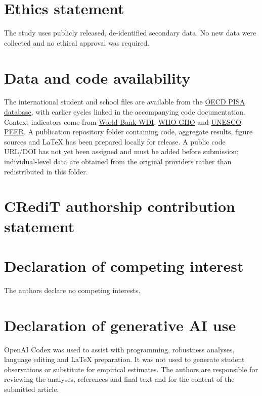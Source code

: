 \documentclass[preprint,12pt,authoryear,nonatbib]{elsarticle}
\newif\ifblindreview
\begin{document}
\section*{Ethics statement}
The study uses publicly released, de-identified secondary data. No new data were collected and no ethical approval was required.

\section*{Data and code availability}
The international student and school files are available from the \href{https://www.oecd.org/en/data/datasets/pisa-2022-database.html}{OECD PISA database}, with earlier cycles linked in the accompanying code documentation. Context indicators come from \href{https://databank.worldbank.org/source/world-development-indicators}{World Bank WDI}, \href{https://www.who.int/data/gho}{WHO GHO} and \href{https://education-profiles.org}{UNESCO PEER}. A publication repository folder containing code, aggregate results, figure sources and LaTeX has been prepared locally for release. A public code URL/DOI has not yet been assigned and must be added before submission; individual-level data are obtained from the original providers rather than redistributed in this folder.

\section*{CRediT authorship contribution statement}
\ifblindreview Author contributions are withheld for anonymous review.\else\fi

\section*{Declaration of competing interest}
The authors declare no competing interests.

\section*{Declaration of generative AI use}
OpenAI Codex was used to assist with programming, robustness analyses, language editing and LaTeX preparation. It was not used to generate student observations or substitute for empirical estimates. The authors are responsible for reviewing the analyses, references and final text and for the content of the submitted article.

\printbibliography
\end{document}
